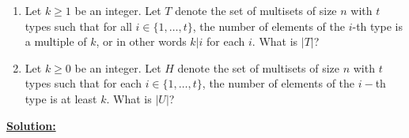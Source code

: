 \documentclass[11pt]{book}
\theoremstyle{definition}
\begin{document}
\begin{enumerate}
\item Let $k\geq 1$ be an integer. Let $T$ denote the set of multisets of size $n$ with $t$ types such that for all $i\in \{1,\dots,t\}$, the number of elements of the $i$-th type is a multiple of $k$, or in other words $k | i$ for each $i$. What is $|T|$?
\item Let $k\geq 0$ be an integer. Let $H$ denote the set of multisets of size $n$ with $t$ types such that for each $i \in \{1,\dots,t\}$, the number of elements of the $i-$th type is at least $k$. What is $|U|$?
\end{enumerate}
\textbf{\underline{Solution:}}
\end{document}
